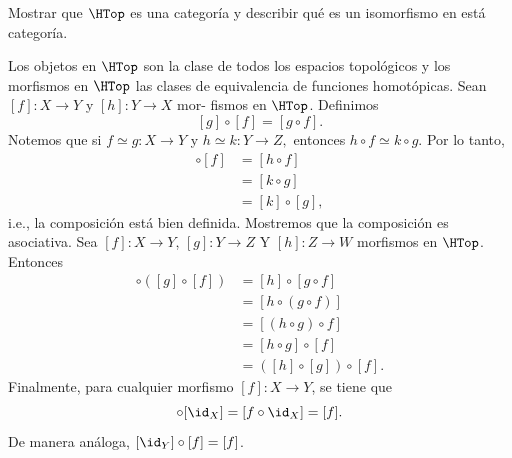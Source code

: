 \begin{ejercicio}
        Mostrar que $\HTop$ es una categoría y describir qué es un isomorfismo en está categoría.
    \end{ejercicio}

\begin{demostracion}
Los objetos en $\HTop$ son la clase de todos los espacios topológicos y los morfismos en $\HTop$ las clases de equivalencia de funciones homotópicas. Sean $[f]:X\to Y$ y $[h]:Y\to X$ mor- fismos en $\HTop$. Definimos
\[
[g]\circ [f]=[g\circ f].
\]
Notemos que si $f\simeq g:X\to Y$ y $h\simeq k:Y\to Z,$ entonces $h\circ f\simeq k\circ g.$ Por lo tanto,
\begin{align*}
    [h]\circ [f]&=[h\circ f]\\
    &=[k\circ g]\\
    &=[k]\circ [g],
\end{align*}
i.e., la composición está bien definida. Mostremos que la composición es asociativa. Sea $[f]:X\to Y$, $[g]:Y\to Z$ Y $[h]:Z\to W$ morfismos en $\HTop$. Entonces
\begin{align*}
    [h]\circ([g]\circ[f])&=[h]\circ [g\circ f]\\
    &=[h\circ (g\circ f)]\\
    &=[(h\circ g)\circ f]\\
    &=[h\circ g]\circ [f]\\
    &=([h]\circ [g])\circ [f].
\end{align*}
Finalmente, para cualquier morfismo $[f]:X\to Y$, se tiene que
\begin{equation*}
    [f]\circ [\id_X]=[f\circ\id_X]=[f].
\end{equation*}
De manera análoga, $[\id_Y]\circ [f]=[f]$.
\end{demostracion}
